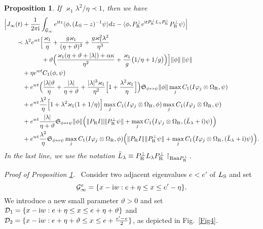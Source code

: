 \documentclass[letterpaper,onecolumn,11pt,accepted=2021-12-09]{quantumarticle}
\numberwithin{equation}{section}
\newcounter{resultcounter}[section]
\newtheorem{prop}[resultcounter]{Proposition}
\newcommand{\sym}{ {\mathfrak S}_{\phi\leftrightarrow\psi}}
\renewcommand{\r}{{\rm R}}
\newcommand{\s}{{\rm S}}
\renewcommand{\i}{{\rm i}}
\begin{document}
\begin{prop}
\label{prop3}
If $\varkappa_1\lambda^2/\eta\prec 1$, then we have 
\begin{align}
\Big|J_\infty(t) & +\frac{1}{2\pi\i} \int_{{\mathcal G}_\infty} e^{\i t z}\langle \phi, (L_\s-z)^{-1}\psi\rangle dz - \langle \phi, P^\perp_\r e^{\i t P^\perp_\r L_\lambda P^\perp_\r} P^\perp_\r \psi\rangle \Big| \nonumber\\
\prec  &\ 
\lambda^2 e^{wt}\Big[ \frac{\varkappa_1}{\eta}+ \frac{g\varkappa_1}{(\eta+\vartheta)^2} + \frac{g\varkappa^2_1\lambda^2}{\eta^3} \nonumber\\
& \qquad \quad+\vartheta \Big(\frac{\varkappa_1(\eta+\vartheta+|\lambda|)+\alpha\kappa}{\eta^2} +\frac{\varkappa_1}{g}\big(1/\eta +1/g\big)\Big)
\Big] \|\phi\|\, \|\psi\|	\nonumber\\
&+\eta e^{wt}C_1(\phi,\psi)\nonumber\\
& +  e^{wt} \Big( \frac{|\lambda|\vartheta}{\eta} + \frac{|\lambda|}{\eta+\vartheta} +\frac{|\lambda|^3\varkappa_1}{\eta^2} \Big[ 1+\frac{\lambda^2\varkappa_1}{\eta}\Big] \Big)\sym \|\phi\|  \max_j C_1(I\varphi_j\otimes\Omega_\r,\psi)  \nonumber \\
&  +e^{wt}\frac{\lambda^2}{\eta} \Big[1+\lambda^2\varkappa_1(1+1/\eta) \Big]\max_j  C_1(I\varphi_j\otimes\Omega_\r, \phi)  \max_j C_1(I\varphi_j\otimes \Omega_\r,\psi) \nonumber\\
&  + e^{wt}\frac{|\lambda| }{\eta+\vartheta} \sym \|\phi\| \Big(  \|P_\r I\|  \|P^\perp_\r\psi\|+ \max_j C_1\big(I\varphi_j\otimes\Omega_\r,(\bar L_\lambda+\i)\psi\big) \Big)\nonumber\\
&  + e^{wt}\frac{\lambda^2}{\eta}  \sym \max_j C_1(I\varphi_j\otimes\Omega_\r, \phi)\Big( \|P_\r I\| \|P^\perp_\r\psi\| + \max_j C_1\big(I\varphi_j\otimes\Omega_\r,(\bar L_\lambda+\i)\psi\big)\Big).
\label{69}
\end{align}
In the last line, we use the notation $\bar L_\lambda\equiv P^\perp_\r L_\lambda P^\perp_\r\upharpoonright_{{\rm Ran}P^\perp_\r}$.
\end{prop}



\medskip
\noindent
{\em Proof of Proposition \ref{prop3}.\ } Consider two adjacent eigenvalues $e<e'$ of $L_\s$ and set
\begin{equation} 
{\mathcal G}^e_\infty=\{x-\i w : e+\eta \le x\le e'-\eta\}.
\label{116} 
\end{equation}
We introduce a new small parameter $\vartheta>0$ and set ${\mathcal D}_1=\{x-\i w : e+\eta \le x\le e+\eta+\vartheta\}$ and ${\mathcal D}_2 = \{x-\i w : e+\eta+\vartheta\le x\le e+\tfrac{e'-e}{2} \}$, as depicted in Fig.~\ref{Fig4}. 
\end{document}
